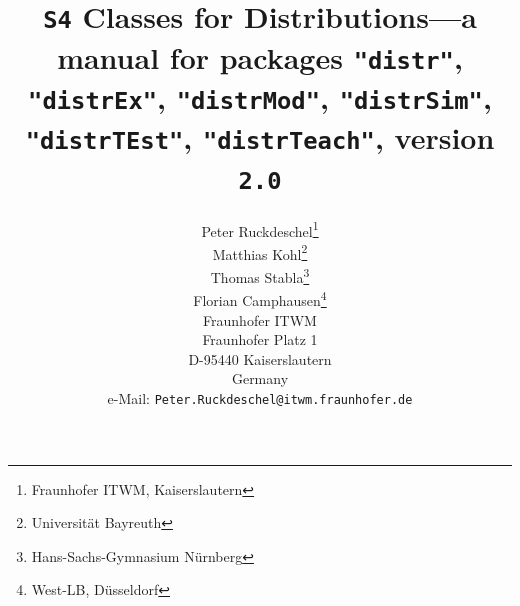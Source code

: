 \documentclass[11pt]{article}
\newcommand{\pkg}[1]{{\tt "#1"}}
\newcommand{\pkgversion}{{\tt 2.0}}
\newcommand{\pkgExversion}{{\tt 2.0}}
\begin{document}
\title{{\tt S4} Classes for Distributions---a manual for packages \pkg{distr},
        \pkg{distrEx}, \pkg{distrMod}, \pkg{distrSim}, \pkg{distrTEst}, \pkg{distrTeach},
        version \pkgversion}
\author{\small Peter Ruckdeschel\thanks{Fraunhofer ITWM, Kaiserslautern}
\\[-.5ex]
\small Matthias Kohl\thanks{Universit\"at Bayreuth}
\\[-.5ex]
\small Thomas Stabla\thanks{Hans-Sachs-Gymnasium N\"urnberg}
\\[-.5ex]
\small Florian Camphausen\thanks{West-LB, D\"usseldorf}
\smallskip\\
\small Fraunhofer ITWM\\[-.5ex]
\small Fraunhofer Platz 1\\[-.5ex]
\small D-95440 Kaiserslautern\\[-.5ex]
\small Germany\\
\small e-Mail: {\small \tt Peter.Ruckdeschel@itwm.fraunhofer.de}\\
}
\maketitle
\end{document}
